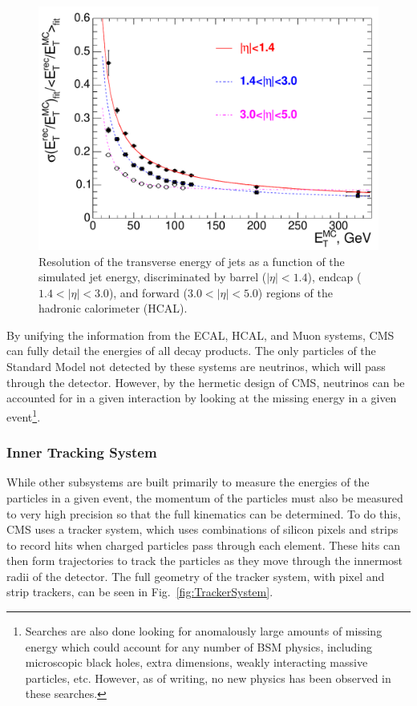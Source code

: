 \begin{figure}[htbp]
\begin{center}
\includegraphics[width=.7\linewidth]{Experiment/figures/HCALResolution.pdf}
\caption[Resolution of the Hadronic Calorimeter as a Function of Simulated Transverse Energy]{Resolution of the transverse energy of jets as a function of the simulated jet energy, discriminated by barrel ($|\eta|<1.4$), endcap ($1.4<|\eta|<3.0$), and forward ($3.0<|\eta|<5.0$) regions of the hadronic calorimeter (HCAL).}
\label{fig:HCALResolution}
\end{center}
\end{figure}

By unifying the information from the ECAL, HCAL, and Muon systems, CMS can fully detail the energies of all decay products. The only particles of the Standard Model not detected by these systems are neutrinos, which will pass through the detector. However, by the hermetic design of CMS, neutrinos can be accounted for in a given interaction by looking at the missing energy in a given event\footnote{Searches are also done looking for anomalously large amounts of missing energy which could account for any number of BSM physics, including microscopic black holes, extra dimensions, weakly interacting massive particles, etc. However, as of writing, no new physics has been observed in these searches.}. 

\subsubsection{Inner Tracking System}
\label{sec:Tracker}

While other subsystems are built primarily to measure the energies of the particles in a given event, the momentum of the particles must also be measured to very high precision so that the full kinematics can be determined. To do this, CMS uses a tracker system, which uses combinations of silicon pixels and strips to record hits when charged particles pass through each element. These hits can then form trajectories to track the particles as they move through the innermost radii of the detector. The full geometry of the tracker system, with pixel and strip trackers, can be seen in Fig.~\ref{fig:TrackerSystem}.

